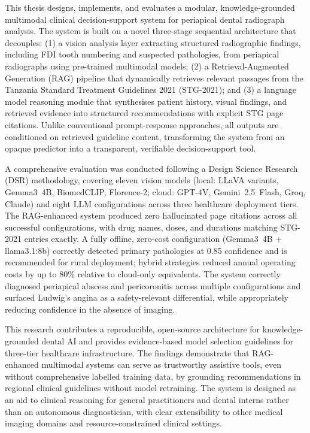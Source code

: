 \documentclass[12pt,a4paper]{report}
\begin{document}
	This thesis designs, implements, and evaluates a modular,
	knowledge-grounded multimodal clinical decision-support system for periapical
	dental radiograph analysis. The system is built on a novel three-stage
	sequential architecture that decouples: (1) a vision analysis layer extracting
	structured radiographic findings, including FDI tooth numbering and suspected
	pathologies, from periapical radiographs using pre-trained multimodal models;
	(2) a Retrieval-Augmented Generation (RAG) pipeline that dynamically retrieves
	relevant passages from the Tanzania Standard Treatment Guidelines 2021
	(STG-2021); and (3) a language model reasoning module that synthesises patient
	history, visual findings, and retrieved evidence into structured recommendations
	with explicit STG page citations. Unlike conventional prompt-response approaches,
	all outputs are conditioned on retrieved guideline content, transforming the
	system from an opaque predictor into a transparent, verifiable decision-support
	tool.
	
	A comprehensive evaluation was conducted following a Design Science Research
	(DSR) methodology, covering eleven vision models (local: LLaVA variants,
	Gemma3~4B, BiomedCLIP, Florence-2; cloud: GPT-4V, Gemini~2.5~Flash, Groq,
	Claude) and eight LLM configurations across three healthcare deployment tiers.
	The RAG-enhanced system produced zero hallucinated page citations across all
	successful configurations, with drug names, doses, and durations matching
	STG-2021 entries exactly. A fully offline, zero-cost configuration
	(Gemma3~4B + llama3.1:8b) correctly detected primary pathologies at 0.85
	confidence and is recommended for rural deployment; hybrid strategies reduced
	annual operating costs by up to 80\% relative to cloud-only equivalents.
	The system correctly diagnosed periapical abscess and pericoronitis across
	multiple configurations and surfaced Ludwig's angina as a safety-relevant
	differential, while appropriately reducing confidence in the absence of imaging.
	
	This research contributes a reproducible, open-source architecture for
	knowledge-grounded dental AI and provides evidence-based model selection
	guidelines for three-tier healthcare infrastructure. The findings demonstrate
	that RAG-enhanced multimodal systems can serve as trustworthy assistive tools,
	even without comprehensive labelled training data, by grounding recommendations
	in regional clinical guidelines without model retraining. The system is designed
	as an aid to clinical reasoning for general practitioners and dental interns
	rather than an autonomous diagnostician, with clear extensibility to other
	medical imaging domains and resource-constrained clinical settings.
	
\end{document}
